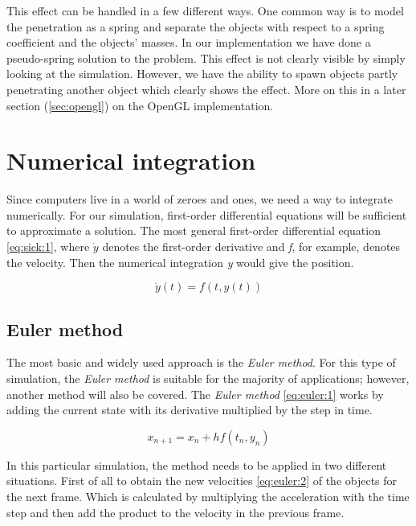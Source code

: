 \documentclass[a4paper,12pt]{report}
\begin{document}
This effect can be handled in a few different ways. One common way is to model the penetration as a spring and separate the objects with respect to a spring coefficient and the objects' masses. In our implementation we have done a pseudo-spring solution to the problem. This effect is not clearly visible by simply looking at the simulation. However, we have the ability to spawn objects partly penetrating another object which clearly shows the effect. More on this in a later section (\ref{sec:opengl}) on the OpenGL implementation.


\section{Numerical integration}

Since computers live in a world of zeroes and ones, we need a way to integrate numerically. For our simulation, first-order differential equations will be sufficient to approximate a solution. The most general first-order differential equation \eqref{eq:sick:1}, where $\dot{y}$ denotes the first-order derivative and \emph{f}, for example, denotes the velocity. Then the numerical integration \emph{y} would give the position.

\begin{equation}
\dot{y}(t)=f(t,y(t))
\label{eq:sick:1}
\end{equation}

\subsection{Euler method}

The most basic and widely used approach is the \emph{Euler method}\cite{gdm}. For this type of simulation, the \emph{Euler method} is suitable for the majority of applications; however, another method will also be covered. The \emph{Euler method} \eqref{eq:euler:1} works by adding the current state with its derivative multiplied by the step in time.

\begin{equation}
x_{n+1}=x_{n}+hf(t_n, y_n)
\label{eq:euler:1}
\end{equation}

In this particular simulation, the method needs to be applied in two different situations. First of all to obtain the new velocities \eqref{eq:euler:2} of the objects for the next frame. Which is calculated by multiplying the acceleration with the time step and then add the product to the velocity in the previous frame.
\end{document}
